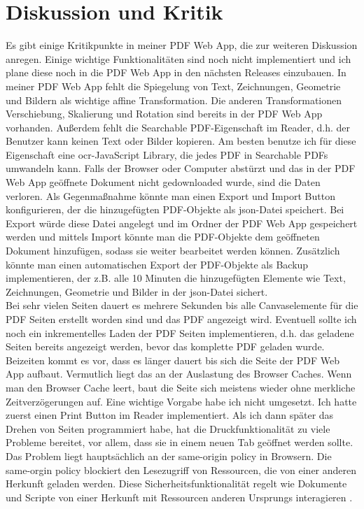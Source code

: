 \chapter{Diskussion und Kritik}
Es gibt einige Kritikpunkte in meiner PDF Web App, die zur weiteren Diskussion anregen. Einige wichtige Funktionalitäten sind noch nicht implementiert und ich plane diese noch in die PDF Web App in den nächsten Releases einzubauen. In meiner PDF Web App fehlt die Spiegelung von Text, Zeichnungen, Geometrie und Bildern als wichtige affine Transformation. Die anderen Transformationen Verschiebung, Skalierung und Rotation sind bereits in der PDF Web App vorhanden. Außerdem fehlt die Searchable PDF-Eigenschaft im Reader, d.h. der Benutzer kann keinen Text oder Bilder kopieren. Am besten benutze ich für diese Eigenschaft eine \gls{ocr}-JavaScript Library, die jedes PDF in Searchable PDFs umwandeln kann. Falls der Browser oder Computer abstürzt und das in der PDF Web App geöffnete Dokument nicht gedownloaded wurde, sind die Daten verloren. Als Gegenmaßnahme könnte man einen Export und Import Button konfigurieren, der die hinzugefügten PDF-Objekte als \gls{json}-Datei speichert. Bei Export würde diese Datei angelegt und im Ordner der PDF Web App gespeichert werden und mittels Import könnte man die PDF-Objekte dem geöffneten Dokument hinzufügen, sodass sie weiter bearbeitet werden können. Zusätzlich könnte man einen automatischen Export der PDF-Objekte als Backup implementieren, der z.B. alle 10 Minuten die hinzugefügten Elemente wie Text, Zeichnungen, Geometrie und Bilder in der \gls{json}-Datei sichert. \\
Bei sehr vielen Seiten dauert es mehrere Sekunden bis alle Canvaselemente für die PDF Seiten erstellt worden sind und das PDF angezeigt wird. Eventuell sollte ich noch ein inkrementelles Laden der PDF Seiten implementieren, d.h. das geladene Seiten bereits angezeigt werden, bevor das komplette PDF geladen wurde. Beizeiten kommt es vor, dass es länger dauert bis sich die Seite der PDF Web App aufbaut. Vermutlich liegt das an der Auslastung des Browser Caches. Wenn man den Browser Cache leert, baut die Seite sich meistens wieder ohne merkliche Zeitverzögerungen auf. Eine wichtige Vorgabe habe ich nicht umgesetzt. Ich hatte zuerst einen Print Button im Reader implementiert. Als ich dann später das Drehen von Seiten programmiert habe, hat die Druckfunktionalität zu viele Probleme bereitet, vor allem, dass sie in einem neuen Tab geöffnet werden sollte. Das Problem liegt hauptsächlich an der same-origin policy in Browsern. Die same-orgin policy blockiert den Lesezugriff von Ressourcen, die von einer anderen Herkunft geladen werden. Diese Sicherheitsfunktionalität regelt wie Dokumente und Scripte von einer Herkunft mit Ressourcen anderen Ursprungs interagieren \cite{same-origin}. 

